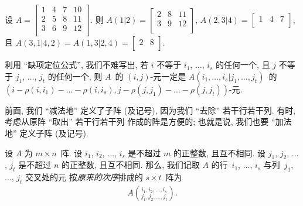 \begin{example}
    设
    \(
    A =
    \begin{bmatrix}
        1 & 4 & 7 & 10 \\
        2 & 5 & 8 & 11 \\
        3 & 6 & 9 & 12 \\
    \end{bmatrix}.
    \)
    则
    \(
    A({1}|{2}) =
    \begin{bmatrix}
        2 & 8 & 11 \\
        3 & 9 & 12 \\
    \end{bmatrix}
    \),
    \(
    A({2,3}|{4}) =
    \begin{bmatrix}
        1 & 4 & 7 \\
    \end{bmatrix}
    \),
    且
    \(
    A({3,1}|{4,2}) = A({1,3}|{2,4}) =
    \begin{bmatrix}
        2 & 8 \\
    \end{bmatrix}
    \).
\end{example}

利用 ``缺项定位公式'', 我们不难写出,
若 \(i\) 不等于 \(i_1\), \(\dots\), \(i_s\) 的任何一个,
且 \(j\) 不等于 \(j_1\), \(\dots\), \(j_t\) 的任何一个,
则 \(A\)~的 \((i, j)\)-元一定是
\(A({i_1, \dots, i_s}|{j_1, \dots, j_t})\)~的
\((i - \rho(i, i_1) - \dots - \rho(i, i_s),
j - \rho(j, j_1) - \dots - \rho(j, j_t))\)-元.

前面, 我们 ``减法地'' 定义了子阵 (及记号),
因为我们 ``去除'' 若干行若干列.
有时, 考虑从原阵 ``取出'' 若干行若干列%
作成的阵是方便的;
也就是说, 我们也要 ``加法地'' 定义子阵 (及记号).

\begin{definition}[子阵, 2]
    设 \(A\) 为 \(m \times n\)~阵.
    设 \(i_1\), \(i_2\), \(\dots\), \(i_s\)
    是不超过 \(m\) 的正整数,
    且互不相同.
    设 \(j_1\), \(j_2\), \(\dots\), \(j_t\)
    是不超过 \(n\) 的正整数,
    且互不相同.
    那么, 我们记取 \(A\) 的行~\(i_1\), \(\dots\), \(i_s\)
    与列~\(j_1\), \(\dots\), \(j_t\) 交叉处的元%
    按\emph{原来的次序}排成的 \(s \times t\)~阵为
    \begin{align*}
        A\binom{i_1, i_2, \dots, i_s}{j_1, j_2, \dots, j_t}.
    \end{align*}
\end{definition}

